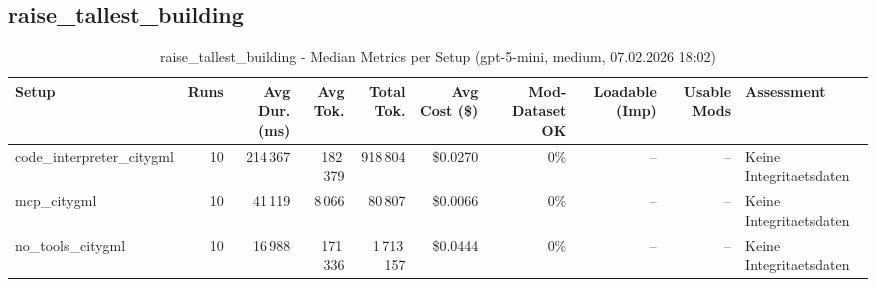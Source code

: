 \documentclass[a4paper,11pt]{article}
\begin{document}
\clearpage

\subsection{raise\_tallest\_building}

\begin{table}[H]
\centering
\scriptsize
\caption{raise\_tallest\_building - Median Metrics per Setup (gpt-5-mini, medium, 07.02.2026 18:02)}
\label{tab:combined\_raise\_tallest\_building\_metrics\_20260207}
\begin{tabular}{l r r r r r r r r l}
\toprule
Setup & Runs & Avg Dur. (ms) & Avg Tok. & Total Tok. & Avg Cost (\$) & Mod-Dataset OK & Loadable (Imp) & Usable Mods & Assessment \\
\midrule
code\_interpreter\_citygml & 10 & 214\,367 & 182\,379 & 918\,804 & \$0.0270 & 0\% & -- & -- & Keine Integritaetsdaten \\
mcp\_citygml & 10 & 41\,119 & 8\,066 & 80\,807 & \$0.0066 & 0\% & -- & -- & Keine Integritaetsdaten \\
no\_tools\_citygml & 10 & 16\,988 & 171\,336 & 1\,713\,157 & \$0.0444 & 0\% & -- & -- & Keine Integritaetsdaten \\
\bottomrule
\end{tabular}
\end{table}
\end{document}
